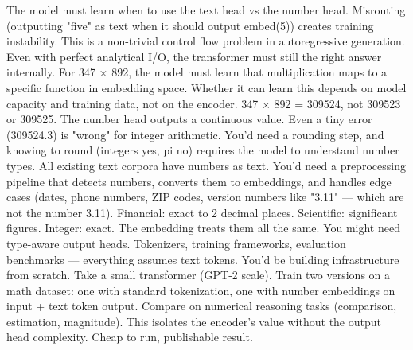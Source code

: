  The model must learn when to use the text head vs the number head. Misrouting (outputting "five" as text when it should output embed(5)) creates training instability. This is a non-trivial control flow problem in autoregressive generation.\markdownRendererOlItemEnd 
{} Even with perfect analytical I/O, the transformer must still  the right answer internally. For 347 × 892, the model must learn that multiplication maps to a specific function in embedding space. Whether it can learn this depends on model capacity and training data, not on the encoder.\markdownRendererOlItemEnd 
{} 347 × 892 = 309524, not 309523 or 309525. The number head outputs a continuous value. Even a tiny error (309524.3) is "wrong" for integer arithmetic. You'd need a rounding step, and knowing  to round (integers yes, pi no) requires the model to understand number types.\markdownRendererOlItemEnd 
{} All existing text corpora have numbers as text. You'd need a preprocessing pipeline that detects numbers, converts them to embeddings, and handles edge cases (dates, phone numbers, ZIP codes, version numbers like "3.11" — which are not the number 3.11).\markdownRendererOlItemEnd 
{} Financial: exact to 2 decimal places. Scientific: significant figures. Integer: exact. The embedding treats them all the same. You might need type-aware output heads.\markdownRendererOlItemEnd 
{} Tokenizers, training frameworks, evaluation benchmarks — everything assumes text tokens. You'd be building infrastructure from scratch.\markdownRendererOlItemEnd 
\markdownRendererOlEndTight \markdownRendererInterblockSeparator
{}
\markdownRendererSectionEnd 
\markdownRendererSectionEnd \markdownRendererSectionBegin
{}\markdownRendererInterblockSeparator
{} Take a small transformer (GPT-2 scale). Train two versions on a math dataset: one with standard tokenization, one with number embeddings on input + text token output. Compare on numerical reasoning tasks (comparison, estimation, magnitude). This isolates the encoder's value without the output head complexity. Cheap to run, publishable result.\markdownRendererParagraphSeparator
